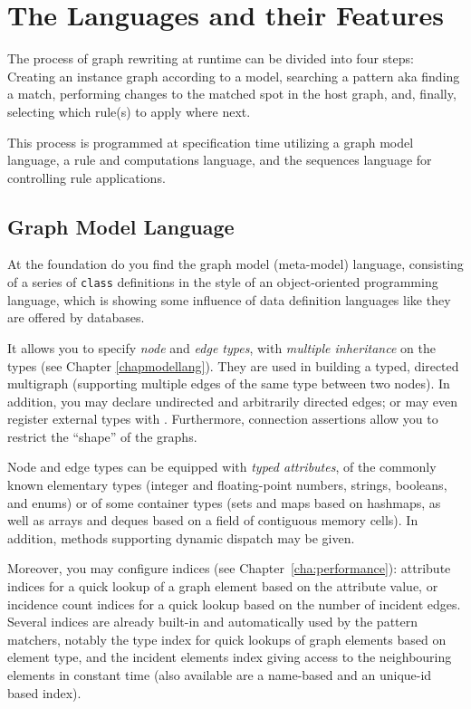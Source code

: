 \section{The Languages and their Features}

The process of graph rewriting at runtime can be divided into four steps:
Creating an instance graph according to a model,
searching a pattern aka finding a match,
performing changes to the matched spot in the host graph,
and, finally, selecting which rule(s) to apply where next.

This process is programmed at specification time utilizing a graph model language, a rule and computations language, and the sequences language for controlling rule applications.

\subsection{Graph Model Language}
At the foundation do you find the graph model (meta-model) language, consisting of a series of \texttt{class} definitions in the style of an object-oriented programming language, which is showing some influence of data definition languages like they are offered by databases. 

It allows you to specify \emph{node} and \emph{edge types}, with \emph{multiple inheritance} on the types (see Chapter \ref{chapmodellang}).
They are used in building a typed, directed multigraph (supporting multiple edges of the same type between two nodes).
In addition, you may declare undirected and arbitrarily directed edges; or may even register external types with \GrG.
Furthermore, connection assertions allow you to restrict the ``shape'' of the graphs.

Node and edge types can be equipped with \emph{typed attributes}, of the commonly known elementary types (integer and floating-point numbers, strings, booleans, and enums) or of some container types (sets and maps based on hashmaps, as well as arrays and deques based on a field of contiguous memory cells).
In addition, methods supporting dynamic dispatch may be given.%

Moreover, you may configure indices (see Chapter~\ref{cha:performance}): attribute indices for a quick lookup of a graph element based on the attribute value, or incidence count indices for a quick lookup based on the number of incident edges.
Several indices are already built-in and automatically used by the pattern matchers, notably the type index for quick lookups of graph elements based on element type, and the incident elements index giving access to the neighbouring elements in constant time (also available are a name-based and an unique-id based index).


